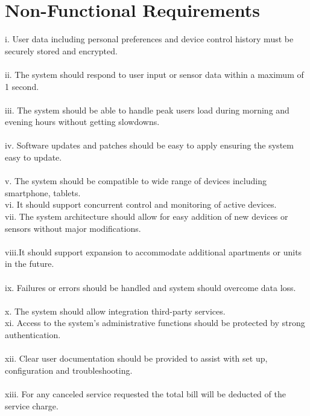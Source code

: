 \section {Non-Functional Requirements}
\Large{
i. User data including personal preferences and device control history must be securely stored and encrypted.\\ \\
ii. The system should respond to user input or sensor data within a maximum of 1 second.\\ \\
iii. The system should be able to handle peak users load during morning and evening hours without getting slowdowns.\\ \\
iv. Software updates and patches should be easy to apply ensuring the system easy to update.\\ \\
v. The system should be compatible to wide range of devices including smartphone, tablets.\\
vi. It should support concurrent control and monitoring of active devices.\\
vii. The system architecture should allow for easy addition of new devices or sensors without major modifications.\\ \\
viii.It should support expansion to accommodate additional apartments or units in the future.\\ \\
ix. Failures or errors should be handled and system should overcome data loss.\\ \\
x. The system should allow integration third-party services.\\
xi. Access to the system's administrative functions should be protected by strong authentication.\\ \\
xii. Clear user documentation should be provided to assist with set up, configuration and troubleshooting.\\\\
xiii. For any canceled service requested the total bill will be deducted of the service charge.\\\\



}

